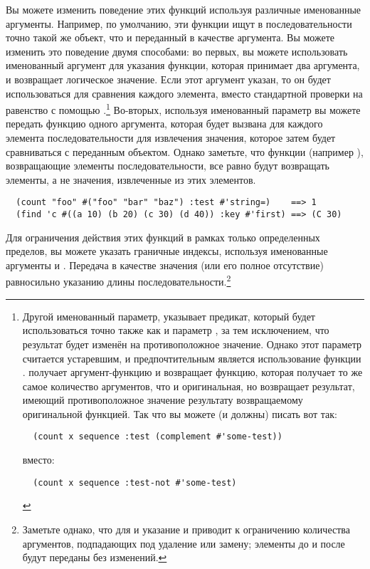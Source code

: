 Вы можете изменить поведение этих функций используя различные именованные аргументы.
Например, по умолчанию, эти функции ищут в последовательности точно такой же объект, что и
переданный в качестве аргумента.  Вы можете изменить это поведение двумя способами: во
первых, вы можете использовать именованный аргумент  для указания функции,
которая принимает два аргумента, и возвращает логическое значение.  Если этот аргумент
указан, то он будет использоваться для сравнения каждого элемента, вместо стандартной
проверки на равенство с помощью .\footnote{Другой именованный параметр,
   указывает предикат, который будет использоваться точно также как и
  параметр , за тем исключением, что результат будет изменён на
  противоположное значение.  Однако этот параметр считается устаревшим, и предпочтительным
  является использование функции .   получает
  аргумент-функцию и возвращает функцию, которая получает то же самое количество
  аргументов, что и оригинальная, но возвращает результат, имеющий противоположное
  значение результату возвращаемому оригинальной функцией.  Так что вы можете (и должны)
  писать вот так:

\begin{verbatim}
  (count x sequence :test (complement #'some-test))
\end{verbatim}

вместо:

\begin{verbatim}
  (count x sequence :test-not #'some-test)
\end{verbatim}

} Во-вторых, используя именованный параметр  вы можете передать функцию одного
аргумента, которая будет вызвана для каждого элемента последовательности для извлечения
значения, которое затем будет сравниваться с переданным объектом.  Однако заметьте, что
функции (например ), возвращающие элементы последовательности, все равно будут
возвращать элементы, а не значения, извлеченные из этих элементов.

\begin{verbatim}
  (count "foo" #("foo" "bar" "baz") :test #'string=)    ==> 1
  (find 'c #((a 10) (b 20) (c 30) (d 40)) :key #'first) ==> (C 30)
\end{verbatim}

Для ограничения действия этих функций в рамках только определенных пределов, вы можете
указать граничные индексы, используя именованные аргументы  и .
Передача  в качестве значения  (или его полное отсутствие)
равносильно указанию длины последовательности.\footnote{Заметьте однако, что для
   и  указание  и  приводит к
  ограничению количества аргументов, подпадающих под удаление или замену; элементы до
   и после  будут переданы без изменений.}


